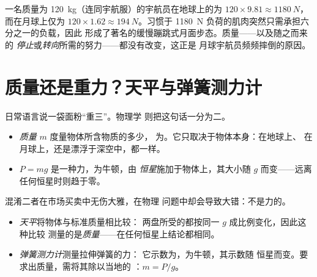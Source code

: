 \begin{remark}[宇航员为何会蹦跳]\label{rem:g10:universal-gravitation:bounce}
一名质量为 \qty{120}{kg}（连同宇航服）的宇航员在地球上的为
$120 \times 9.81 \approx \qty{1180}{N}$，而在月球上仅为
$120 \times 1.62 \approx \qty{194}{N}$。习惯于
\qty{1180}{N} 负荷的肌肉突然只需承担六分之一的负载，因此
形成了著名的缓慢蹦跳式月面步态。质量——以及随之而来的
\emph{停止}或\emph{转向}所需的努力——都没有改变，这正是
月球宇航员频频摔倒的原因。
\end{remark}

\section{质量还是重力？天平与弹簧测力计}

日常语言说一袋面粉“重三”。物理学
则把这句话一分为二。

\begin{remark}[质量不是重力]\label{rem:g10:universal-gravitation:massweight}
\begin{itemize}
  \item \emph{质量} $m$ 度量物体所含物质的多少，
        为。它只取决于物体本身：在地球上、
        在月球上，还是漂浮于深空中，都一样。
  \item \emph{} $P = mg$ 是一种力，为牛顿，由
        \emph{恒星}施加于物体上，其大小随
        $g$ 而变——远离任何恒星时则趋于零。
\end{itemize}
混淆二者在市场买卖中无伤大雅，在物理
问题中却会导致大错：不是力的。
\end{remark}

\begin{method}[天平与弹簧测力计]\label{met:g10:universal-gravitation:instruments}
\begin{itemize}
  \item \emph{天平}将物体与标准质量相比较：
        两盘所受的都按同一 $g$ 成比例变化，因此这种比较
        测量的是\emph{质量}——在任何恒星上结论都相同。
  \item \emph{弹簧测力计}测量拉伸弹簧的力：
        它示数为\emph{}，为牛顿，其示数随
        恒星而变。要求出质量，需将其除以当地的
        ：$m = P/g$。
\end{itemize}
\end{method}

